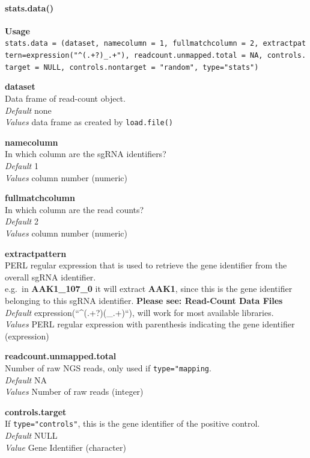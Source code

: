 \documentclass[]{article}
\let\oldparagraph\paragraph
\renewcommand{\paragraph}[1]{\oldparagraph{#1}\mbox{}}
\begin{document}
\paragraph{stats.data()}\label{stats.data}

\textbf{Usage}\\
\texttt{stats.data\ =\ (dataset,\ namecolumn\ =\ 1,\ fullmatchcolumn\ =\ 2,\ extractpattern=expression("\^{}(.+?)\_.+"),\ readcount.unmapped.total\ =\ NA,\ controls.target\ =\ NULL,\ controls.nontarget\ =\ "random",\ type="stats")}

\textbf{dataset}\\
Data frame of read-count object.\\
\emph{Default} none\\
\emph{Values} data frame as created by \texttt{load.file()}

\textbf{namecolumn}\\
In which column are the sgRNA identifiers?\\
\emph{Default} 1\\
\emph{Values} column number (numeric)

\textbf{fullmatchcolumn}\\
In which column are the read counts?\\
\emph{Default} 2\\
\emph{Values} column number (numeric)

\textbf{extractpattern}\\
PERL regular expression that is used to retrieve the gene identifier
from the overall sgRNA identifier.\\
e.g.~in \textbf{AAK1\_107\_0} it will extract \textbf{AAK1}, since this
is the gene identifier belonging to this sgRNA identifier.
\textbf{Please see: Read-Count Data Files}\\
\emph{Default} expression(``\^{}(.+?)(\_.+)``), will work for most
available libraries.\\
\emph{Values} PERL regular expression with parenthesis indicating the
gene identifier (expression)

\textbf{readcount.unmapped.total}\\
Number of raw NGS reads, only used if \texttt{type="mapping}.\\
\emph{Default} NA\\
\emph{Values} Number of raw reads (integer)

\textbf{controls.target}\\
If \texttt{type="controls"}, this is the gene identifier of the positive
control.\\
\emph{Default} NULL\\
\emph{Value} Gene Identifier (character)
\end{document}
